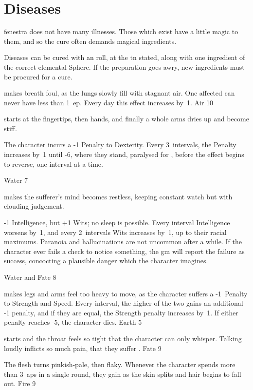 \section{Diseases}
\label{diseases}

\begin{multicols}{2}
\renewcommand\npcsymbol{\glsentrytext{sickness}}

\noindent
\Gls{fenestra} does not have many illnesses.
Those which exist have a little magic to them, and so the cure often demands magical \glspl{ingredient}.

Diseases can be cured with an  roll, at the \gls{tn} stated, along with one \gls{ingredient} of the correct elemental Sphere.
If the preparation goes awry, new \glspl{ingredient} must be procured for a cure.

%
  {makes breath foul, as the lungs slowly fill with stagnant air.
    One affected can never have less than 1~\gls{ep}.
    Every day this effect increases by~1.
  }%
  {Air}%
  {10}

%
  {starts at the fingertips, then hands, and finally a whole arms dries up and become stiff.

    The character incurs a -1 Penalty to Dexterity.
    Every 3~\glspl{interval}, the Penalty increases by~1 until -6, where they stand, paralysed for , before the effect begins to reverse, one \gls{interval} at a time.}%
  {Water}%
  {7}

%
  {makes the sufferer's mind becomes restless, keeping constant watch but with clouding judgement.

    -1 Intelligence, but +1 Wits; no sleep is possible.
    Every \gls{interval} Intelligence worsens by~1, and every 2~\glspl{interval} Wits increases by~1, up to their racial maximums.%
    Paranoia and hallucinations are not uncommon after a while.
    If the character ever fails a check to notice something, the \gls{gm} will report the failure as success, concocting a plausible danger which the character imagines.}%
  {Water and Fate}%
  {8}

%
  {makes legs and arms feel too heavy to move, as the character suffers a -1~Penalty to Strength and Speed.
  Every \gls{interval}, the higher of the two gains an additional -1 penalty, and if they are equal, the Strength penalty increases by~1.
  If either penalty reaches -5, the character dies.}%
  {Earth}%
  {5}

%
  {starts and the throat feels so tight that the character can only whisper.
  Talking loudly inflicts so much pain, that they suffer .}%
  {Fate}%
  {9}

%
  {The flesh turns pinkish-pale, then flaky.
  Whenever the character spends more than 3~\glspl{ap} in a single round, they gain  as the skin splits and hair begins to fall out.}%
  {Fire}%
  {9}

\end{multicols}
